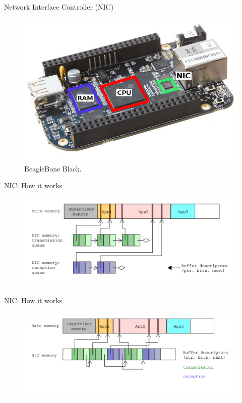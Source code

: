 \documentclass[xcolor={x11names}]{beamer}
\begin{document}
\begin{frame}{Network Interface Controller (NIC)}
    \begin{figure}
        \includegraphics[]{figures/BBB_cpu_ram_nic.png}
        \caption{BeagleBone Black.}
        \label{bbb_nic}
    \end{figure}
\end{frame}

\begin{frame}{NIC: How it works}
    \begin{figure}
        \includegraphics[width=\textwidth]{figures/nic-bd.pdf}
        \label{nic_bd}
    \end{figure}
\end{frame}

\begin{frame}{NIC: How it works}
    \begin{figure}
        \includegraphics[width=\textwidth]{figures/nic-bd-in_mem.pdf}
        \label{nic_bd_inmem}
    \end{figure}
\end{frame}
\end{document}

